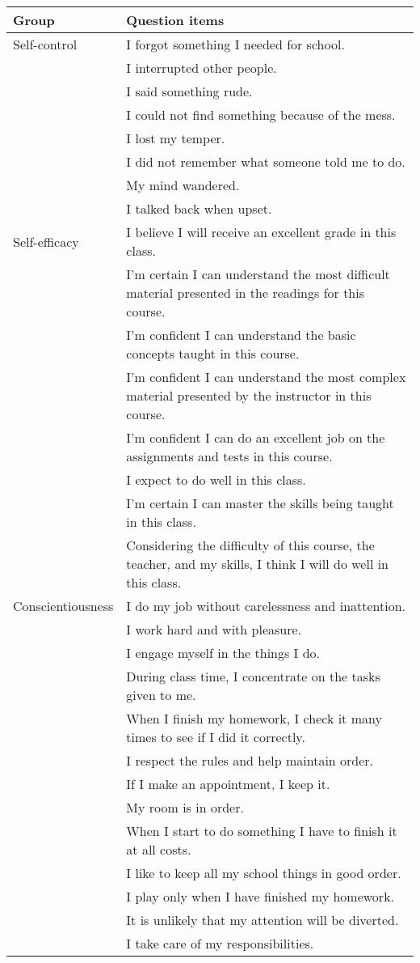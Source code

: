 \begin{tabular}{ll}
\hline \hline 
Group & Question items \\
\hline 
Self-control & I forgot something I needed for school. \\
 & I interrupted other people. \\
 & I said something rude. \\
 & I could not find something because of the mess. \\
 & I lost my temper. \\
 & I did not remember what someone told me to do. \\
 & My mind wandered. \\
 & I talked back when upset. \\
Self-efficacy & I believe I will receive an excellent grade in this class. \\
 & I'm certain I can understand the most difficult material presented in the readings for this course. \\
 & I'm confident I can understand the basic concepts taught in this course. \\
 & I'm confident I can understand the most complex material presented by the instructor in this course. \\
 & I'm confident I can do an excellent job on the assignments and tests in this course. \\
 & I expect to do well in this class. \\
 & I'm certain I can master the skills being taught in this class. \\
 & Considering the difficulty of this course, the teacher, and my skills, I think I will do well in this class. \\
Conscientiousness & I do my job without carelessness and inattention. \\
 & I work hard and with pleasure. \\
 & I engage myself in the things I do. \\
 & During class time, I concentrate on the tasks given to me. \\
 & When I finish my homework, I check it many times to see if I did it correctly. \\
 & I respect the rules and help maintain order. \\
 & If I make an appointment, I keep it. \\
 & My room is in order. \\
 & When I start to do something I have to finish it at all costs. \\
 & I like to keep all my school things in good order. \\
 & I play only when I have finished my homework. \\
 & It is unlikely that my attention will be diverted. \\
 & I take care of my responsibilities. \\
\hline \hline
\end{tabular}